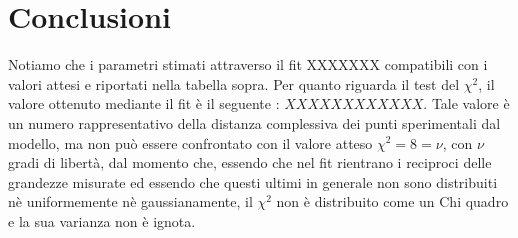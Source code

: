 \documentclass{article}
\begin{document}
	\section{Conclusioni }
	Notiamo che i parametri stimati attraverso il fit XXXXXXX compatibili con i valori attesi e riportati nella tabella sopra. Per quanto riguarda il test del $\chi^{2}$, il valore ottenuto mediante il fit è il seguente : $XXXXXXXXXXXX$.
    Tale valore è un numero rappresentativo della distanza complessiva dei punti sperimentali dal modello, ma non può essere confrontato con il valore atteso $\chi^{2} = 8 = \nu$, con $\nu$ gradi di libertà, dal momento che, essendo che nel fit rientrano i reciproci delle grandezze misurate ed essendo che questi ultimi in generale non sono distribuiti nè uniformemente nè gaussianamente, il $\chi^{2}$ non è distribuito come un Chi quadro e la sua varianza non è ignota.
\end{document}
